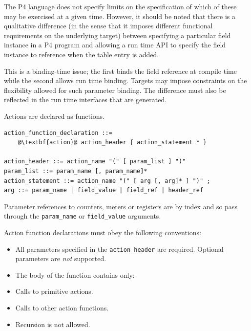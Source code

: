 \documentclass[12pt]{article}
\begin{document}
The P4 language does not specify limits on the specification of which of these
may be exercised at a given time. However, it should be noted that there is
a qualitative difference (in the sense that it imposes different functional
requirements on the underlying target) between specifying a particular field
instance in a P4 program and allowing a run time API to specify the field
instance to reference when the table entry is added.

This is a binding-time issue; the first binds the field reference at compile
time while the second allows run time binding. Targets may impose constraints
on the flexibility allowed for such parameter binding. The difference must
also be reflected in the run time interfaces that are generated.


Actions are declared as functions.

\begin{lstlisting}[frame=single,backgroundcolor=\color{bnfgreen},escapechar=\@]
action_function_declaration ::=
    @\textbf{action}@ action_header { action_statement * }

action_header ::= action_name "(" [ param_list ] ")"
param_list ::= param_name [, param_name]*
action_statement ::= action_name "(" [ arg [, arg]* ] ")" ;
arg ::= param_name | field_value | field_ref | header_ref
\end{lstlisting}

Parameter references to counters, meters or registers are by index and so
pass through the \texttt{param_name} or \texttt{field_value} arguments.

Action function declarations must obey the following conventions:

\begin{itemize}
\item
All parameters specified in the \texttt{action_header} are required. Optional parameters
are \textit{not} supported.
\item
The body of the function contains only:
\end{itemize}

\begin{itemize}
\item
Calls to primitive actions.
\item
Calls to other action functions.
\end{itemize}

\begin{itemize}
\item
Recursion is not allowed.
\end{itemize}
\end{document}
